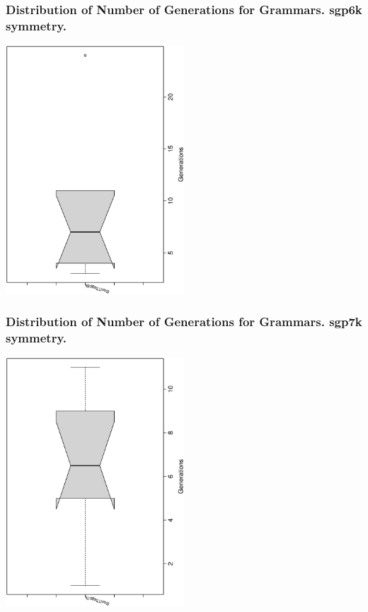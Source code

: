 \documentclass[18pt,c]{beamer}
\begin{document}
 \begin{frame}
 \frametitle{ Distribution of Number of Generations for Grammars. sgp6k  symmetry. }
 \begin{center}
\includegraphics[width=0.5\textwidth, angle=-90]
{ExpFboxplottGenerations004.eps}
 \end{center}
 \label{ExpFboxplottGenerations004.eps}  
 \end{frame}

 \begin{frame}
 \frametitle{ Distribution of Number of Generations for Grammars. sgp7k  symmetry. }
 \begin{center}
\includegraphics[width=0.5\textwidth, angle=-90]
{ExpFboxplottGenerations005.eps}
 \end{center}
 \label{ExpFboxplottGenerations005.eps}  
 \end{frame}
\end{document}
